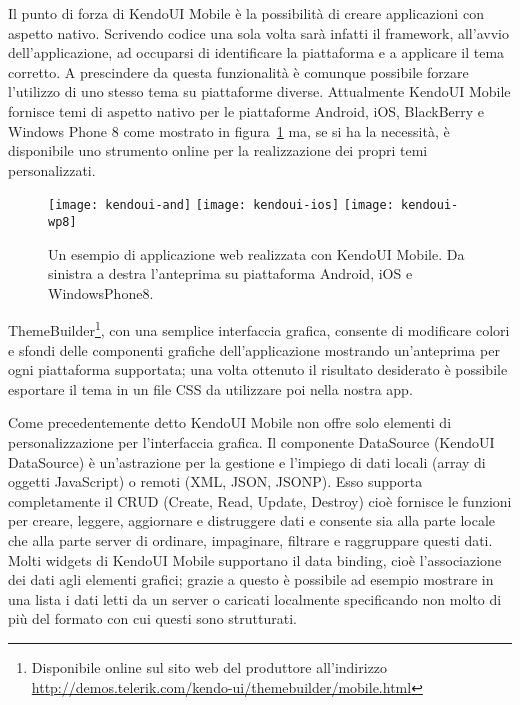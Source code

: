 			Il punto di forza di KendoUI Mobile è la possibilità di creare
			applicazioni con aspetto nativo. Scrivendo codice una sola volta
			sarà infatti il framework, all'avvio dell'applicazione, ad occuparsi
			di identificare la piattaforma e a applicare il tema corretto. A
			prescindere da questa funzionalità è comunque possibile forzare
			l'utilizzo di uno stesso tema su piattaforme diverse. Attualmente
			KendoUI Mobile fornisce temi di aspetto nativo per le piattaforme
			Android, iOS, BlackBerry e Windows Phone 8 come mostrato in
			figura~\ref{fig:kendoui} ma, se si ha la necessità, è disponibile
			uno strumento online per la realizzazione dei propri temi
			personalizzati.
			\begin{figure}[h]
				\centering
				\texttt{[image: kendoui-and]}
				\texttt{[image: kendoui-ios]}
				\texttt{[image: kendoui-wp8]}
				\caption{
					Un esempio di applicazione web realizzata con KendoUI Mobile.
					Da sinistra a destra l'anteprima su piattaforma Android, iOS
					e WindowsPhone8.
				}
				\label{fig:kendoui}
			\end{figure}
			ThemeBuilder\footnote{Disponibile online sul sito web del produttore
			all'indirizzo \url{http://demos.telerik.com/kendo-ui/themebuilder/mobile.html}},
			con una semplice interfaccia grafica, consente di modificare colori e
			sfondi delle componenti grafiche dell'applicazione mostrando
			un'anteprima per ogni piattaforma supportata; una volta ottenuto il
			risultato desiderato è possibile esportare il tema in un file CSS da
			utilizzare poi nella nostra app.
			
			Come precedentemente detto KendoUI Mobile non offre solo elementi
			di personalizzazione per l'interfaccia grafica. Il componente
			DataSource (KendoUI DataSource) è un'astrazione per la gestione e
			l'impiego di dati locali (array di oggetti JavaScript) o remoti
			(XML, JSON, JSONP).	Esso supporta completamente il CRUD (Create,
			Read, Update, Destroy) cioè fornisce le funzioni per creare,
			leggere, aggiornare e distruggere dati e consente sia alla parte
			locale che alla parte server di ordinare, impaginare, filtrare e
			raggruppare questi dati. Molti widgets di KendoUI Mobile supportano
			il data binding, cioè l'associazione dei dati agli elementi grafici;
			grazie a questo	è possibile ad esempio mostrare in una lista i dati
			letti da un	server o caricati localmente specificando non molto di
			più del formato con	cui questi sono strutturati.

